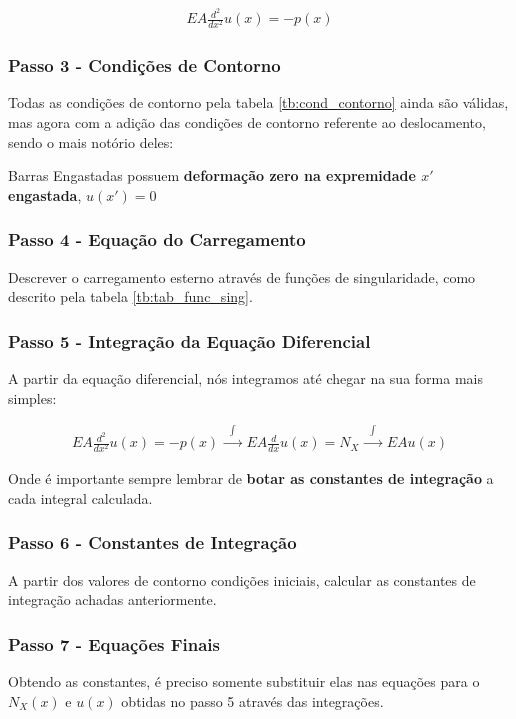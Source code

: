 \documentclass{article}
\begin{document}
\begin{align*}
    EA\frac{d^2}{dx^2}u(x) = -p(x)
\end{align*}

\subsubsection*{Passo 3 - Condições de Contorno}
Todas as condições de contorno pela tabela \ref{tb:cond_contorno} ainda são válidas, mas agora com a adição das condições de contorno referente ao deslocamento, sendo o mais notório deles:

\begin{center}
    Barras Engastadas possuem \textbf{deformação zero na expremidade $x'$ engastada}, $u(x') = 0$
\end{center}


\subsubsection*{Passo 4 - Equação do Carregamento}
Descrever o carregamento esterno através de funções de singularidade, como descrito pela tabela \ref{tb:tab_func_sing}.


\subsubsection*{Passo 5 - Integração da Equação Diferencial}
A partir da equação diferencial, nós integramos até chegar na sua forma mais simples:

\begin{align*}
    EA \frac{d^2}{dx^2}u(x) = -p(x) \xrightarrow{\ \ \ \int \ \ \ } EA \frac{d}{dx} u(x) = N_X \xrightarrow{\ \ \ \int \ \ \ } EA u(x)
\end{align*}

Onde é importante sempre lembrar de \textbf{botar as constantes de integração} a cada integral calculada.

\subsubsection*{Passo 6 - Constantes de Integração}
A partir dos valores de contorno condições iniciais, calcular as constantes de integração achadas anteriormente.

\subsubsection*{Passo 7 - Equações Finais}
Obtendo as constantes, é preciso somente substituir elas nas equações para o $N_X(x)$ e $u(x)$ obtidas no passo 5 através das integrações.
\end{document}
